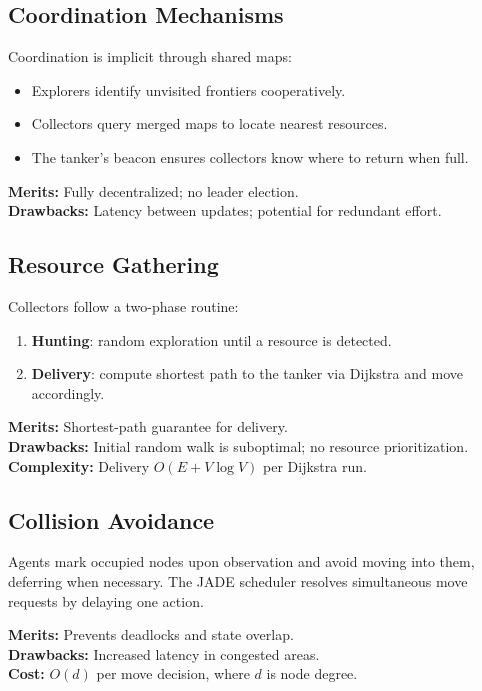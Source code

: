 \documentclass[a4paper, 12pt]{report}
\begin{document}
\subsection{Coordination Mechanisms}
Coordination is implicit through shared maps:
\begin{itemize}
  \item Explorers identify unvisited frontiers cooperatively.
  \item Collectors query merged maps to locate nearest resources.
  \item The tanker’s beacon ensures collectors know where to return when full.
\end{itemize}

\textbf{Merits:} Fully decentralized; no leader election.\\
\textbf{Drawbacks:} Latency between updates; potential for redundant effort.

\subsection{Resource Gathering}
Collectors follow a two-phase routine:
\begin{enumerate}
  \item \textbf{Hunting}: random exploration until a resource is detected.
  \item \textbf{Delivery}: compute shortest path to the tanker via Dijkstra and move accordingly.
\end{enumerate}

\textbf{Merits:} Shortest-path guarantee for delivery.\\
\textbf{Drawbacks:} Initial random walk is suboptimal; no resource prioritization.\\
\textbf{Complexity:} Delivery $O(E + V\log V)$ per Dijkstra run.

\subsection{Collision Avoidance}
Agents mark occupied nodes upon observation and avoid moving into them, deferring when necessary. The JADE scheduler resolves simultaneous move requests by delaying one action.

\textbf{Merits:} Prevents deadlocks and state overlap.\\
\textbf{Drawbacks:} Increased latency in congested areas.\\
\textbf{Cost:} $O(d)$ per move decision, where $d$ is node degree.
\end{document}

